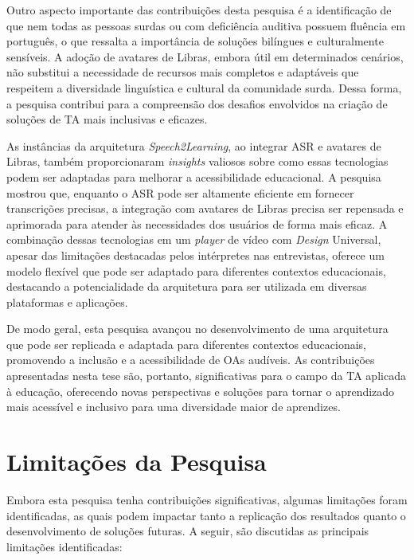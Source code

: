 Outro aspecto importante das contribuições desta pesquisa é a identificação de que nem todas as pessoas surdas ou com deficiência auditiva possuem fluência em português, o que ressalta a importância de soluções bilíngues e culturalmente sensíveis. A adoção de avatares de Libras, embora útil em determinados cenários, não substitui a necessidade de recursos mais completos e adaptáveis que respeitem a diversidade linguística e cultural da comunidade surda. Dessa forma, a pesquisa contribui para a compreensão dos desafios envolvidos na criação de soluções de TA mais inclusivas e eficazes.

As instâncias da arquitetura \textit{Speech2Learning}, ao integrar ASR e avatares de Libras, também proporcionaram \textit{insights} valiosos sobre como essas tecnologias podem ser adaptadas para melhorar a acessibilidade educacional. A pesquisa mostrou que, enquanto o ASR pode ser altamente eficiente em fornecer transcrições precisas, a integração com avatares de Libras precisa ser repensada e aprimorada para atender às necessidades dos usuários de forma mais eficaz. A combinação dessas tecnologias em um \textit{player} de vídeo com \textit{Design} Universal, apesar das limitações destacadas pelos intérpretes nas entrevistas, oferece um modelo flexível que pode ser adaptado para diferentes contextos educacionais, destacando a potencialidade da arquitetura para ser utilizada em diversas plataformas e aplicações.

De modo geral, esta pesquisa avançou no desenvolvimento de uma arquitetura que pode ser replicada e adaptada para diferentes contextos educacionais, promovendo a inclusão e a acessibilidade de OAs audíveis. As contribuições apresentadas nesta tese são, portanto, significativas para o campo da TA aplicada à educação, oferecendo novas perspectivas e soluções para tornar o aprendizado mais acessível e inclusivo para uma diversidade maior de aprendizes.

\section{Limitações da Pesquisa}

Embora esta pesquisa tenha contribuições significativas, algumas limitações foram identificadas, as quais podem impactar tanto a replicação dos resultados quanto o desenvolvimento de soluções futuras. A seguir, são discutidas as principais limitações identificadas:

